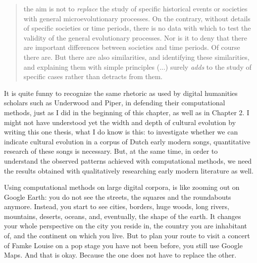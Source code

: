 \begin{quote}
	the aim is not to \textit{replace} the study of specific historical events or societies with general microevolutionary processes. On the contrary, without details of specific societies or time periods, there is no data with which to test the validity of the general evolutionary processes. Nor is it to deny that there are important differences between societies and time periods. Of course there are. But there are also similarities, and identifying these similarities, and explaining them with simple principles (...) surely \textit{adds} to the study of specific cases rather than detracts from them.\autocite[132]{mesoudi_cultural_2011}
\end{quote}

\noindent It is quite funny to recognize the same rhetoric as used by digital humanities scholars such as Underwood and Piper, in defending their computational methods, just as I did in the beginning of this chapter, as well as in Chapter 2. I might not have understood yet the width and depth of cultural evolution by writing this one thesis, what I do know is this: to investigate whether we can indicate cultural evolution in a corpus of Dutch early modern songs, quantitative research of these songs is necessary. But, at the same time, in order to understand the observed patterns achieved with computational methods, we need the results obtained with qualitatively researching early modern literature as well.

Using computational methods on large digital corpora, is like zooming out on Google Earth: you do not see the streets, the squares and the roundabouts anymore. Instead, you start to see cities, borders, huge woods, long rivers, mountains, deserts, oceans, and, eventually, the shape of the earth. It changes your whole perspective on the city you reside in, the country you are inhabitant of, and the continent on which you live. But to plan your route to visit a concert of Famke Louise on a pop stage you have not been before, you still use Google Maps. And that is okay. Because the one does not have to replace the other.


